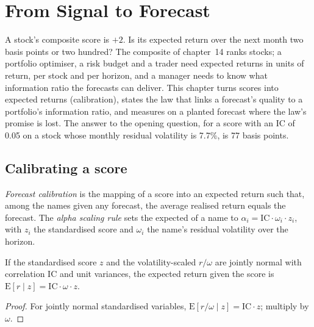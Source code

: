 \chapter{From Signal to Forecast}\label{ch:rs:from-signal-to-forecast}

A stock's composite score is $+2$. Is its expected return over the next month two basis points or two hundred? The composite of
chapter~14 ranks stocks; a portfolio optimiser, a risk budget and a trader need expected returns in units of return, per stock
and per horizon, and a manager needs to know what information ratio the forecasts can deliver. This chapter turns scores into
expected returns (calibration), states the law that links a forecast's quality to a portfolio's information ratio, and measures on a
planted forecast where the law's promise is lost. The answer to the opening question, for a score with an IC of 0.05 on a stock whose
monthly residual volatility is 7.7\%, is 77 basis points.

\section{Calibrating a score}

\begin{definition}\label{def:rs:from-signal-to-forecast:calibration}
\emph{Forecast calibration} is the mapping of a score into an expected return such that, among the names
given any forecast, the average realised return equals the forecast. The \emph{alpha scaling rule} sets the
expected  of a name to $\alpha_i = \mathrm{IC}\cdot\omega_i\cdot z_i$, with $z_i$ the standardised score and $\omega_i$ the
name's residual volatility over the horizon.
\end{definition}

\begin{proposition}\label{prop:rs:from-signal-to-forecast:scaling}
If the standardised score $z$ and the volatility-scaled  $r/\omega$ are jointly normal with correlation $\mathrm{IC}$ and
unit variances, the expected return given the score is $\mathrm{E}[r \mid z] = \mathrm{IC}\cdot\omega\cdot z$.
\end{proposition}

\begin{proof}
For jointly normal standardised variables, $\mathrm{E}[r/\omega \mid z] = \mathrm{IC}\cdot z$; multiply by $\omega$.
\end{proof}

